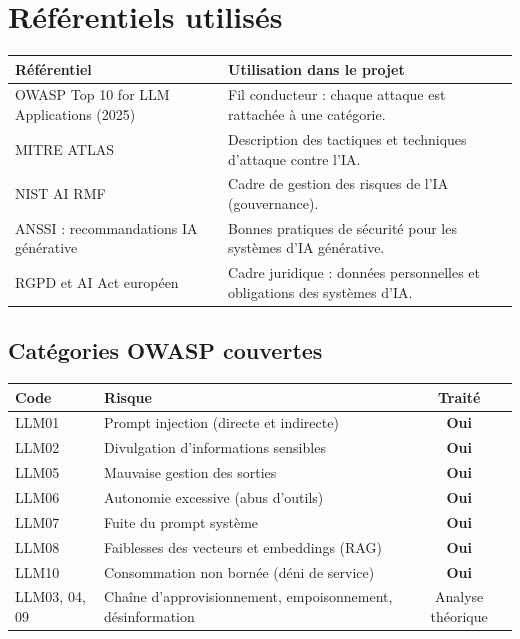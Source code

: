 \documentclass[11pt,a4paper]{article}
\begin{document}
\section{Référentiels utilisés}

\begin{tabularx}{\linewidth}{@{}lY@{}}
\toprule
\textbf{Référentiel} & \textbf{Utilisation dans le projet} \\
\midrule
OWASP Top 10 for LLM Applications (2025) & Fil conducteur : chaque attaque est rattachée à une catégorie. \\
MITRE ATLAS & Description des tactiques et techniques d'attaque contre l'IA. \\
NIST AI RMF & Cadre de gestion des risques de l'IA (gouvernance). \\
ANSSI : recommandations IA générative & Bonnes pratiques de sécurité pour les systèmes d'IA générative. \\
RGPD et AI Act européen & Cadre juridique : données personnelles et obligations des systèmes d'IA. \\
\bottomrule
\end{tabularx}

\subsection{Catégories OWASP couvertes}
\begin{tabularx}{\linewidth}{@{}lYc@{}}
\toprule
\textbf{Code} & \textbf{Risque} & \textbf{Traité} \\
\midrule
LLM01 & Prompt injection (directe et indirecte) & \textcolor{vert}{\textbf{Oui}} \\
LLM02 & Divulgation d'informations sensibles & \textcolor{vert}{\textbf{Oui}} \\
LLM05 & Mauvaise gestion des sorties & \textcolor{vert}{\textbf{Oui}} \\
LLM06 & Autonomie excessive (abus d'outils) & \textcolor{vert}{\textbf{Oui}} \\
LLM07 & Fuite du prompt système & \textcolor{vert}{\textbf{Oui}} \\
LLM08 & Faiblesses des vecteurs et embeddings (RAG) & \textcolor{vert}{\textbf{Oui}} \\
LLM10 & Consommation non bornée (déni de service) & \textcolor{vert}{\textbf{Oui}} \\
LLM03, 04, 09 & Chaîne d'approvisionnement, empoisonnement, désinformation & \textcolor{gris}{Analyse théorique} \\
\bottomrule
\end{tabularx}
\end{document}
